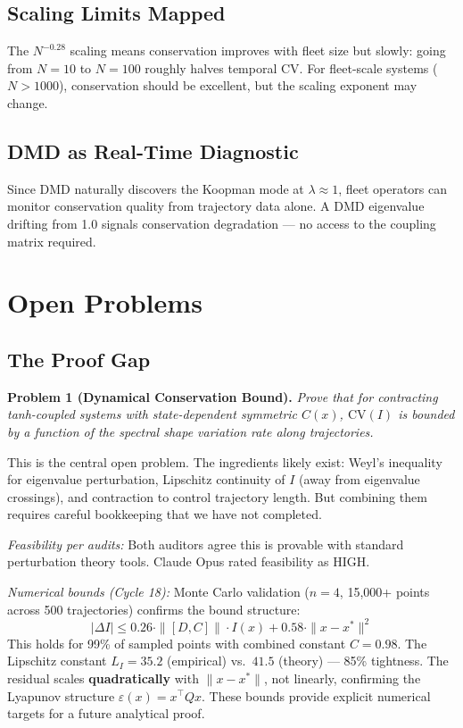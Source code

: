 \documentclass[11pt]{article}
\begin{document}
\subsection{Scaling Limits Mapped}

The $N^{-0.28}$ scaling means conservation improves with fleet size but slowly: going from $N = 10$ to $N = 100$ roughly halves temporal CV. For fleet-scale systems ($N > 1000$), conservation should be excellent, but the scaling exponent may change.

\subsection{DMD as Real-Time Diagnostic}

Since DMD naturally discovers the Koopman mode at $\lambda \approx 1$, fleet operators can monitor conservation quality from trajectory data alone. A DMD eigenvalue drifting from 1.0 signals conservation degradation --- no access to the coupling matrix required.

\section{Open Problems}

\subsection{The Proof Gap}

\textbf{Problem 1 (Dynamical Conservation Bound).} \textit{Prove that for contracting tanh-coupled systems with state-dependent symmetric $C(x)$, $\mathrm{CV}(I)$ is bounded by a function of the spectral shape variation rate along trajectories.}

This is the central open problem. The ingredients likely exist: Weyl's inequality for eigenvalue perturbation, Lipschitz continuity of $I$ (away from eigenvalue crossings), and contraction to control trajectory length. But combining them requires careful bookkeeping that we have not completed.

\textit{Feasibility per audits:} Both auditors agree this is provable with standard perturbation theory tools. Claude Opus rated feasibility as HIGH.

\textit{Numerical bounds (Cycle 18):} Monte Carlo validation ($n = 4$, 15{,}000+ points across 500 trajectories) confirms the bound structure:
\begin{equation}
  |\Delta I| \leq 0.26 \cdot \|[D,C]\| \cdot I(x) + 0.58 \cdot \|x - x^*\|^2
\end{equation}
This holds for 99\% of sampled points with combined constant $C = 0.98$. The Lipschitz constant $L_I = 35.2$ (empirical) vs.\ $41.5$ (theory) --- 85\% tightness. The residual scales \textbf{quadratically} with $\|x - x^*\|$, not linearly, confirming the Lyapunov structure $\varepsilon(x) = x^\top Q x$. These bounds provide explicit numerical targets for a future analytical proof.
\end{document}
